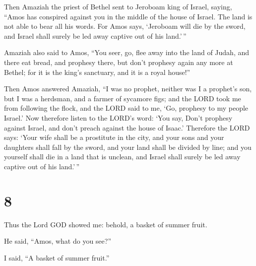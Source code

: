  Then Amaziah the priest of Bethel sent to Jeroboam king of
Israel, saying, ``Amos has conspired against you in the middle of the
house of Israel. The land is not able to bear all his words.
 For Amos says, `Jeroboam will die by the sword, and Israel
shall surely be led away captive out of his land.'\,''

 Amaziah also said to Amos, ``You seer, go, flee away into
the land of Judah, and there eat bread, and prophesy there,
 but don't prophesy again any more at Bethel; for it is the
king's sanctuary, and it is a royal house!''

 Then Amos answered Amaziah, ``I was no prophet, neither
was I a prophet's son, but I was a herdsman, and a farmer of sycamore
figs;  and the LORD took me from following the flock, and
the LORD said to me, `Go, prophesy to my people Israel.' 
Now therefore listen to the LORD's word: `You say, Don't prophesy
against Israel, and don't preach against the house of Isaac.'
 Therefore the LORD says: `Your wife shall be a prostitute
in the city, and your sons and your daughters shall fall by the sword,
and your land shall be divided by line; and you yourself shall die in a
land that is unclean, and Israel shall surely be led away captive out of
his land.'\,''

\hypertarget{section-7}{%
\section{8}\label{section-7}}

 Thus the Lord GOD showed me: behold, a basket of summer
fruit.

 He said, ``Amos, what do you see?''

I said, ``A basket of summer fruit.''


